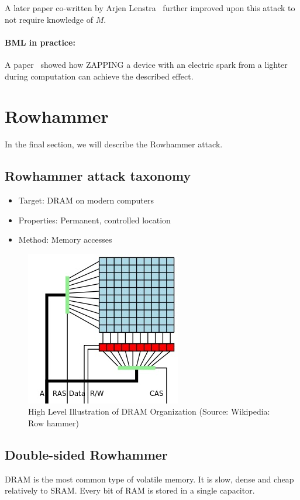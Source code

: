 A later paper co-written by Arjen Lenstra~\cite{lenstra} further improved upon
this attack to not require knowledge of \(M\).

\paragraph{BML in practice:} A paper~\cite{schmidt} showed how ZAPPING a device
with an electric spark from a lighter during computation can achieve the
described effect.

\section{Rowhammer}\label{sec:rowhammer}
In the final section, we will describe the Rowhammer attack.
\subsection{Rowhammer attack taxonomy}\label{subsec:rowhammer_attack_taxonomy}
	\begin{itemize}
		\item Target: DRAM on modern computers
		\item Properties: Permanent, controlled location
		\item Method: Memory accesses
	\end{itemize}

\begin{figure}[!ht]
	\centering
	\includegraphics[width=0.5\linewidth]{images/chapter_9/DRAM.jpg}
	\caption{High Level Illustration of DRAM Organization (Source: Wikipedia: Row hammer)}\label{fig:dram_svg}
\end{figure}

\subsection{Double-sided Rowhammer}\label{subsec:double_sided_rowhammer}
DRAM is the most common type of volatile memory. It is slow, dense and cheap
relatively to SRAM\@. Every bit of RAM is stored in a single capacitor.

